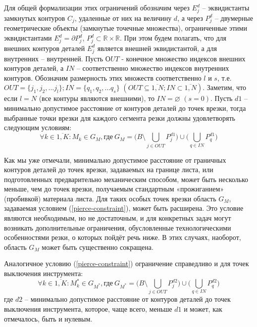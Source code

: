 \documentclass[12pt]{report}
\begin{document}
Для общей формализации этих ограничений обозначим через
$E_j^d$ – эквидистанты замкнутых контуров $C_j$,
удаленные от них на величину $d$,
а через
$P_j^d$ – двумерные геометрические объекты (замкнутые точечные множества),
ограниченные этими эквидистантами
$E_j^d = \partial P_j^d$,
$P_j^d \subset \mathbb R \times \mathbb R$.
При этом будем полагать,
что для внешних контуров деталей
$E_j^d$
является внешней эквидистантой,
а для внутренних – внутренней.
Пусть $ОUT$ - конечное множество индексов внешних контуров деталей,
а $IN$ – соответственно множество индексов внутренних контуров.
Обозначим  размерность этих множеств соответственно $l$ и $s$,
т.е.
$OUT = \{j_1, j_2, \dots j_l\};
IN = \{q_1, q_2, \dots q_s\}$
$(OUT  \subseteq \overline{1,N};
IN  \subset \overline{1,N})$.
Заметим, что если $l=N$
(все контуры являются внешними), то
$IN = \varnothing$
$(s = 0)$.
Пусть $d1$ – минимально допустимое расстояние от контуров деталей до точек врезки,
тогда выбранные точки врезки для каждого сегмента резки должны удовлетворять следующим условиям:
\begin{equation}
  \forall k \in \overline{1,K}:
  M_k \in G_M,
  \text{где}\:
  G_M = \big(B \setminus \bigcup_{j\in OUT} P_j^{d1} \big)
  \cup
  \big( \bigcup_{q\in IN}P_q^{d1} \big)
  \label{pierce-constraint}
\end{equation}

Как мы уже отмечали,
минимально допустимое расстояние от граничных контуров деталей
до точек врезки,
задаваемых на границе листа,
или подготовленных предварительно механическим способом,
может быть несколько меньше,
чем до точек врезки, получаемым стандартным «прожиганием» (пробивкой) материала листа.
Для таких особых точек врезки область $G_M$,
задаваемая условием (\ref{pierce-constraint}),
может быть расширена.
Это условие являются необходимым, но не достаточным,
и для конкретных задач могут возникать дополнительные ограничения,
обусловленные технологическими особенностями резки,
о которых пойдёт речь ниже.
В этих случаях, наоборот, область $G_M$
может быть существенно сокращена.

Аналогичное условию (\ref{pierce-constraint})
ограничение справедливо и для точек выключения инструмента:
\begin{equation}
  \forall k \in \overline{1,K}:
  M_k^* \in G_{M^*},
  \text{где}\:
  G_{M^*} = \big(B \setminus \bigcup_{j\in OUT} P_j^{d2} \big)
	\cup
  \big( \bigcup_{q\in IN}P_q^{d2} \big)
  \label{tool-off-constraint}
\end{equation}
где $d2$ – минимально допустимое расстояние
от контуров деталей до точек выключения инструмента,
которое, чаще всего, меньше $d1$
и может, как отмечалось, быть и нулевым.
\end{document}
